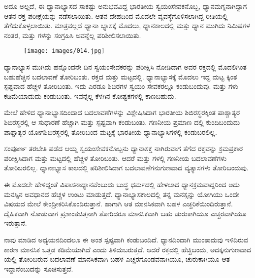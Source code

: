 ಅದೂ ಅಲ್ಲದೆ, ಈ ಧ್ಯಾನಾಭ್ಯಾಸದ ಸಾಕಷ್ಟು ಅನುಭವವಿದ್ದ ಭಾರತೀಯ ಸ್ವಯಂಸೇವಕನೊಬ್ಬ, ಧ್ಯಾನಮಗ್ನನಾಗಿದ್ದಾಗ ಆತನ ರಕ್ತ ಪರೀಕ್ಷೆಯನ್ನು ನಡೆಸಲಾಯಿತು. ಆತನ ದೇಹದಿಂದ ಮೊದಲೇ ವ್ಯವಸ್ಥೆಗೊಳಿಸಲಾಗಿದ್ದ ರೀತಿಯಲ್ಲಿ  ತೆಗೆದುಕೊಳ್ಳಲಾಯಿತು. ಮಾತ್ರವಲ್ಲದೆ ಧ್ಯಾನಾ ಭ್ಯಾಸಕ್ಕೆ ಮೊದಲು, ಧ್ಯಾನಕಾಲದಲ್ಲಿ ಮತ್ತು ಧ್ಯಾನ ಮುಗಿದು  ನಿಮಿಷಗಳ ನಂತರ,  ಮತ್ತು  ಗಳನ್ನು ಸಂಗ್ರಹಿಸಿ ಅವನ್ನೆಲ್ಲ ಪರಿಶೀಲಿಸಲಾಯಿತು.

\begin{figure}
\texttt{[image: images/014.jpg]}
\end{figure}

ಧ್ಯಾನಾಭ್ಯಾಸ ಮುಗಿದು ಹನ್ನೊಂದನೇ ದಿನ ಸ್ವಯಂಸೇವಕರನ್ನು ಪರೀಕ್ಷಿಸಿ ನೋಡಿದಾಗ ಅವರ ರಕ್ತದಲ್ಲಿ ಮೊದಲಿಗಿಂತ ಬಹುಹೆಚ್ಚಿನ ಬದಲಾವಣೆ ತೋರಿಬಂತು. ರಕ್ತದ  ಮತ್ತು  ಮಟ್ಟದಲ್ಲಿ. ಧ್ಯಾನಾಭ್ಯಾಸಕ್ಕೆ ಮೊದಲು ಇದ್ದ ಮಟ್ಟ ಕ್ಕಿಂತ ಸ್ಪಷ್ಟವಾದ ಹೆಚ್ಚಳ ತೋರಿಬಂತು. ಇದು ಎರಡೂ ಶಿಬಿರಗಳ ಸ್ವಯಂ ಸೇವಕರಲ್ಲೂ ಕಂಡುಬಂದುವು.  ಮತ್ತು  ಗಳು ಕಡಿಮೆಯಾದುದು ಕಂಡುಬಂತು. ಇವನ್ನೆಲ್ಲ ಕೆಳಗಿನ ಕೋಷ್ಟಕಗಳಲ್ಲಿ ಕಾಣಬಹುದು.

ಮೇಲೆ ಹೇಳಿದ ಧ್ಯಾನಾಭ್ಯಾಸದಿಂದಾದ ಬದಲಾವಣೆಗಳನ್ನು ವಿಶ್ಲೇಷಿಸಿದಾಗ ಭಾರತೀಯ ಶಿಬಿರಸ್ಥರಕ್ಕಿಂತ ಪಾಶ್ಚಾತ್ಯರ ಶಿಬಿರಸ್ಥರಲ್ಲಿ ಆ ಸುಧಾರಣೆ ಹೆಚ್ಚಾಗಿ ಮತ್ತು ಸ್ಪಷ್ಟವಾಗಿ ಕಂಡುಬಂತು.  ಗಣನೀಯ ಪ್ರಮಾಣ ದಲ್ಲಿ ಕುಂದಿಬಂದುದು ಪಾಶ್ಚಾತ್ಯರ ಯೋಗಶಿಬಿರಸ್ಥರಲ್ಲಿ ತೋರಿಬಂದ ಮಟ್ಟಕ್ಕೆ ಭಾರತೀಯ ಧ್ಯಾನಾಭ್ಯಾಸಿಗಳಲ್ಲಿ ಕಂಡುಬರಲಿಲ್ಲ.

ಸಂಪೂರ್ಣ ತರಬೇತಿ ಪಡೆದ ಆಯ್ದ ಸ್ವಯಂಸೇವಕನೊಬ್ಬನು ಧ್ಯಾನಾಸಕ್ತ ನಾಗಿರುವಾಗ ತೆಗೆದ ರಕ್ತವನ್ನು ಕ್ರಮಪ್ರಕಾರ ಪರೀಕ್ಷಿಸಿದಾಗ  ಮತ್ತು  ಮಟ್ಟದಲ್ಲಿ ಹೆಚ್ಚಳ ತೋರಿಬಂತು. ಆದರೆ  ಮತ್ತು  ಗಳಲ್ಲಿ ಗಣನೀಯ ಬದಲಾವಣೆಗಳು ತೋರಿಬರಲಿಲ್ಲ. ಧ್ಯಾನಾಭ್ಯಾಸ ಕಾಲದಲ್ಲಿ  ಪರಿಶೀಲಿಸಿದಾಗ  ಬದಲಾವಣೆಗನುಗುಣವಾದ ವ್ಯತ್ಯಾಸಗಳು ತೋರಿಬಂದುವು.

ಈ ಮೊದಲೇ ಹೇಳಿದ್ದಂತೆ ವಿಪಾಸನಾಧ್ಯಾನವೆಂಬುದು ಬುದ್ಧ ಧರ್ಮದಲ್ಲಿ ಹೇಳಲಾದ ಧ್ಯಾನಕ್ರಮವಾದ್ದರಿಂದ ಅದು ಮನಸ್ಸಿನ ಅವಧಾನದ ಹೆಚ್ಚಳ ಉಂಟು ಮಾಡುತ್ತದೆ. ಧ್ಯಾನಾಭ್ಯಾಸಕಾಲದಲ್ಲಿ ತನ್ನ ಮನಸ್ಸನ್ನು ಯೋಗಿಯು ಒಂದೇ ವಿಷಯದ ಮೇಲೆ ಕೇಂದ್ರೀಕರಿಸಿಕೊಂಡಿರುತ್ತಾನೆ. ಹಾಗಾಗಿ ಆತ ಮಾನಸಿಕವಾಗಿ ಬಹಳ ಎಚ್ಚರಿಕೆಯಿಂದಿರುತ್ತಾನೆ. ದೈಹಿಕವಾಗಿ ನೋಡುವಾಗ ಪ್ರಶಾಂತಚಿತ್ತನಾಗಿ ತೋರಿದರೂ ಮಾನಸಿಕವಾಗಿ ಬಹು ಚುರುಕಾಗಿಯೂ ಎಚ್ಚರವಾಗಿಯೂ ಇರುತ್ತಾನೆ.

ನಾವು ಮಾಡಿದ ಅಧ್ಯಯನದಿಂದಲೂ ಈ ಅಂಶ ಸ್ಪಷ್ಟವಾಗಿ ಕಂಡುಬಂದಿದೆ. ಧ್ಯಾನದಿಂದಾಗಿ  ಮುಂತಾದುವು ಇಳಿದಿರುವ ಕಾರಣ ಮಾನಸಿಕ ಒತ್ತಡ ಕಡಿಮೆಯಾಗಿದೆ ಎಂದು ತಿಳಿದುಬರುತ್ತದೆ. ಆದರೆ ರಕ್ತದಲ್ಲಿ  ಹೆಚ್ಚಿಬಂದು, ಅದಕ್ಕನುಗುಣವಾದ  ಯಲ್ಲಿ ತೋರಿಬರುವ ಬದಲಾವಣೆ ಮಾನಸಿಕವಾಗಿ ಬಹಳ ಎಚ್ಚರಗೊಂಡವನಾಗಿಯೂ, ಚುರುಕಾಗಿಯೂ ಆತ ಇದ್ದಾನೆಂಬುದನ್ನು ಸೂಚಿಸುತ್ತದೆ.

